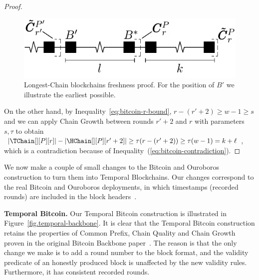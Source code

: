 \begin{proof}
  \begin{figure}
    \centering
    \includegraphics[width=0.45\columnwidth,keepaspectratio]{figures/longest-chain-proof.pdf}
    \caption{Longest-Chain blockchains freshness proof. For the position of $B'$ we illustrate the
             earliest possible.
    }
   \label{fig:longest-chain-freshness-proof}
  \end{figure}


  On the other hand, by Inequality~\ref{eq:bitcoin-r-bound}, $r - (r' + 2) \geq w - 1 \geq s$ and
  we can apply Chain Growth between rounds $r' + 2$ and $r$
  with parameters $s, \tau$ to obtain
  $|\TChain[][P][r]| - |\HChain[][P][r' + 2]| \geq \tau(r - (r' + 2)) \geq \tau (w - 1) =  k + \ell$,
  which is a contradiction because of Inequality~(\ref{eq:bitcoin-contradiction}).
  \Qed
\end{proof}

We now make a couple of small changes to the Bitcoin and Ouroboros
construction to turn them into Temporal Blockchains.
Our changes correspond to the real Bitcoin and Ouroboros deployments, in which timestamps (recorded rounds)
are included in the block
headers~\cite{mastering-bitcoin}. 

\noindent
\textbf{Temporal Bitcoin.}
Our Temporal Bitcoin construction is illustrated in Figure~\ref{fig.temporal-backbone}.
It is clear that the Temporal Bitcoin construction retains the properties of Common Prefix,
Chain Quality and Chain Growth proven in the original Bitcoin Backbone paper~\cite{backbone}.
The reason is that the only change we make is to add a round number to the block format, and
the validity predicate of an honestly produced block is unaffected by the new validity rules.
Furthermore, it has consistent recorded rounds.

